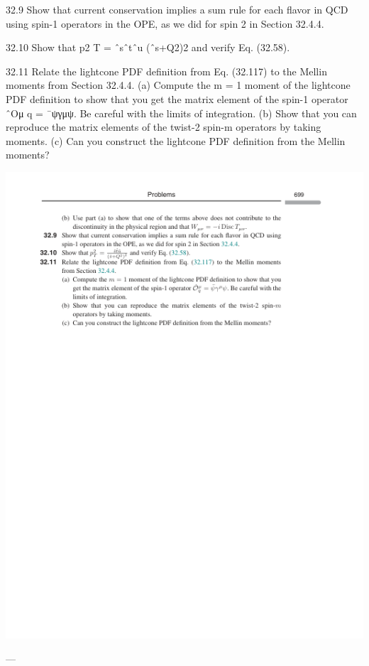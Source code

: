 32.9 Show that current conservation implies a sum rule for each ﬂavor in QCD using
spin-1 operators in the OPE, as we did for spin 2 in Section 32.4.4.

32.10 Show that p2
T =
ˆsˆtˆu
(ˆs+Q2)2 and verify Eq. (32.58).

32.11 Relate the lightcone PDF deﬁnition from Eq. (32.117) to the Mellin moments
from Section 32.4.4.
(a) Compute the m = 1 moment of the lightcone PDF deﬁnition to show that you
get the matrix element of the spin-1 operator ˆOμ
q = ¯ψγμψ. Be careful with the
limits of integration.
(b) Show that you can reproduce the matrix elements of the twist-2 spin-m
operators by taking moments.
(c) Can you construct the lightcone PDF deﬁnition from the Mellin moments?

\includegraphics{./figs/32_Quantum_chromodynamics_and_the_parton_model_page_719.png}

---

